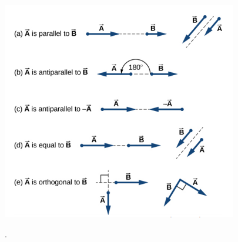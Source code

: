 \documentclass[11pt]{article}
\begin{document}
    \begin{center}
    	\includegraphics[scale=0.6]{vectors.png}
    \end{center}
    .
\end{document}
